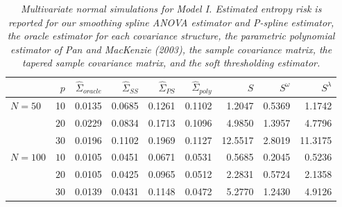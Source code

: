 \bigskip
\setlength{\dashlinedash}{0.5pt}
\setlength{\dashlinegap}{1pt}
\setlength{\arrayrulewidth}{0.2pt}
%
\begin{table}[H]
\centering
\caption{\textit{Multivariate normal simulations for Model I. Estimated entropy risk is reported for our smoothing spline ANOVA estimator and P-spline estimator, the oracle estimator for each covariance structure, the parametric polynomial estimator of Pan and MacKenzie (2003), the sample covariance matrix, the tapered sample covariance matrix, and the soft thresholding estimator.}}
\begin{tabular}{lrrrrrrrr}
 & $p$ & $\hat{\Sigma}_{oracle}$& $\hat{\Sigma}_{SS}$& $\hat{\Sigma}_{PS}$ & $\hat{\Sigma}_{poly}$ & $S$ &$S^\omega$& $S^\lambda$ \\ 
  \hline
$N = 50$ & 10 &0.0135 & 0.0685 & 0.1261 &  0.1102 & 1.2047 & 0.5369 & 1.1742 \\ 
   & $20$ & 0.0229 & 0.0834 & 0.1713 &  0.1096 & 4.9850 & 1.3957 & 4.7796 \\ 
   & $30$ & 0.0196 & 0.1102 & 0.1969 &  0.1127 & 12.5517 & 2.8019 & 11.3175 \\ 
 $N = 100$ & $10$ & 0.0105 & 0.0451 & 0.0671 & 0.0531 & 0.5685 & 0.2045 & 0.5236 \\ 
   & $20$ & 0.0105 &0.0425 & 0.0965 &  0.0512 & 2.2831 & 0.5724 & 2.1358 \\ 
   & $30$ &0.0139 & 0.0431 & 0.1148 &  0.0472 & 5.2770 & 1.2430 & 4.9126 \\ 
   \hline
\end{tabular}
\label{table:simulation-1-entropy-loss-sigma-1}
\end{table}




